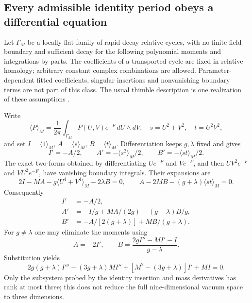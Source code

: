 \subsection{Every admissible identity period obeys a differential equation}
Let $\Gamma_M$ be a locally flat family of rapid-decay relative cycles, with no finite-field boundary and sufficient decay for the following polynomial moments and integrations by parts. The coefficients of a transported cycle are fixed in relative homology; arbitrary constant complex combinations are allowed. Parameter-dependent fitted coefficients, singular insertions and nonvanishing boundary terms are not part of this class. The usual thimble description is one realization of these assumptions \cite{WittenCycles}.

Write
\[
\langle P\rangle_M=\frac1{2\pi}\int_{\Gamma_M}P(U,V)e^{-F}\,dU\wedge dV,
\quad s=U^2+V^2,\quad t=U^2V^2,
\]
and set $I=\langle1\rangle_M$, $A=\langle s\rangle_M$, $B=\langle t\rangle_M$. Differentiation keeps $g,\lambda$ fixed and gives
\[
I'=-A/2,\qquad A'=-\langle s^2\rangle_M/2,
\qquad B'=-\langle st\rangle_M/2.
\]
The exact two-forms obtained by differentiating $Ue^{-F}$ and $Ve^{-F}$, and then $UV^2e^{-F}$ and $VU^2e^{-F}$, have vanishing boundary integrals. Their expansions are
\[
2I-MA-g\langle U^4+V^4\rangle_M-2\lambda B=0,
\qquad A-2MB-(g+\lambda)\langle st\rangle_M=0.
\]
Consequently
\begin{equation}\label{qua:moment-system}
\begin{aligned}
I'&=-A/2,\\
A'&=-I/g+MA/(2g)-(g-\lambda)B/g,\\
B'&=-A/[2(g+\lambda)]+MB/(g+\lambda).
\end{aligned}
\end{equation}
For $g\ne\lambda$ one may eliminate the moments using
\[
A=-2I',\qquad B=\frac{2gI''-MI'-I}{g-\lambda}.
\]
Substitution yields
\[
2g(g+\lambda)I'''-(3g+\lambda)MI''
+[M^2-(3g+\lambda)]I'+MI=0.
\]
Only the subsystem probed by the identity insertion and mass derivatives has rank at most three; this does not reduce the full nine-dimensional vacuum space to three dimensions.

